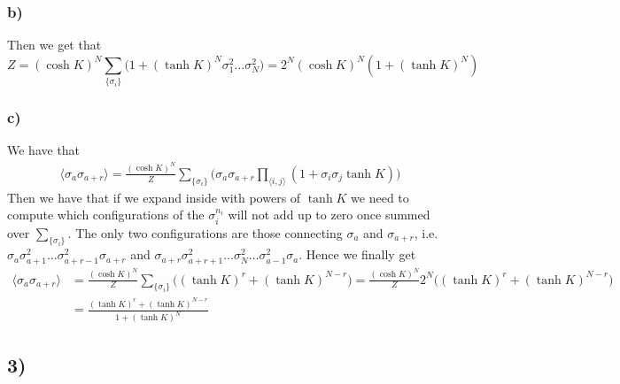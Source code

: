 \documentclass[10pt,a4paper]{book}
\begin{document}
\subsubsection*{b)}
Then we get that 
$$Z=(\cosh K)^N \sum_{\{\sigma_i\}} \bigg(1+(\tanh K)^N\sigma_1^{2}\ldots\sigma_N^2\bigg)=2^{N}(\cosh K)^N(1+(\tanh K)^N)$$

\subsubsection*{c)}
We have that
\begin{align*}
\langle \sigma_a\sigma_{a+r}\rangle =\frac{(\cosh K)^N}{Z}\sum_{\{\sigma_i\}}\bigg(\sigma_a\sigma_{a+r}\prod_{\langle i,j\rangle}(1+\sigma_i\sigma_j\tanh K)\bigg)
\end{align*}
Then we have that if we expand inside with powers of $\tanh K$ we need to compute which configurations of the $\sigma_i^{n_i}$ will not add up to zero once summed over $\sum_{\{\sigma_i\}}$. The only two configurations are those connecting $\sigma_a$ and $\sigma_{a+r}$, i.e. $\sigma_a\sigma_{a+1}^2\ldots\sigma_{a+r-1}^2\sigma_{a+r}$ and $\sigma_{a+r}\sigma_{a+r+1}^2\ldots\sigma_N^2\ldots\sigma_{a-1}^2\sigma_a$. Hence we finally get 
\begin{align*}
\langle \sigma_a\sigma_{a+r}\rangle&=\frac{(\cosh K)^N}{Z}\sum_{\{\sigma_i\}}\bigg((\tanh K)^{r}+(\tanh K)^{N-r}\bigg)=\frac{(\cosh K)^N}{Z}2^N\bigg((\tanh K)^{r}+(\tanh K)^{N-r}\bigg)\\
&=\frac{(\tanh K)^r+(\tanh K)^{N-r}}{1+(\tanh K)^N}
\end{align*}


\subsection*{3)}
\end{document}
